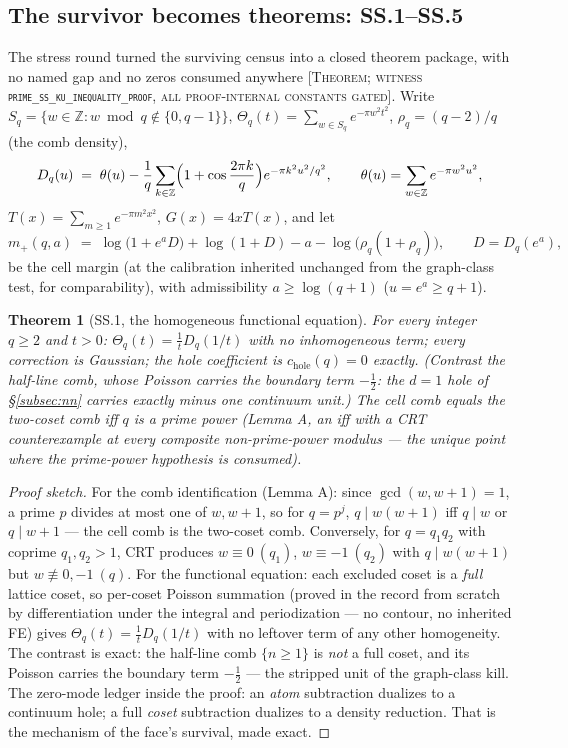 \documentclass[11pt,reqno]{amsart}
\theoremstyle{plain}
\newtheorem{theorem}{Theorem}[section]
\theoremstyle{definition}
\theoremstyle{remark}
\newcommand{\Z}{\mathbb{Z}}
\newcommand{\grade}[1]{\textup{[\textsc{#1}]}}
\begin{document}
\subsection{The survivor becomes theorems: SS.1--SS.5}\label{subsec:ss}

The stress round turned the surviving census into a closed theorem package, with no named
gap and no zeros consumed anywhere \grade{Theorem; witness
\texttt{prime\_\allowbreak ss\_\allowbreak ku\_\allowbreak inequality\_\allowbreak proof}, all proof-internal constants gated}. Write
$S_q = \{w \in \Z : w \bmod q \notin \{0, q-1\}\}$,
$\Theta_q(t) = \sum_{w \in S_q} e^{-\pi w^2 t^2}$, $\rho_q = (q-2)/q$ (the comb
density),
\[
D_q(u) \;=\; \theta(u) - \frac1q \sum_{k \in \Z}
\Bigl(1 + \cos\frac{2\pi k}{q}\Bigr) e^{-\pi k^2 u^2/q^2},
\qquad \theta(u) = \sum_{w \in \Z} e^{-\pi w^2 u^2},
\]
$T(x) = \sum_{m \ge 1} e^{-\pi m^2 x^2}$, $G(x) = 4xT(x)$, and let
\[
m_+(q, a) \;=\; \log\bigl(1 + e^a D\bigr) + \log(1 + D) - a -
\log\bigl(\rho_q (1 + \rho_q)\bigr), \qquad D = D_q(e^a),
\]
be the cell margin (at the calibration inherited unchanged from the graph-class test, for
comparability), with admissibility $a \ge \log(q+1)$ ($u = e^a \ge q+1$).

\begin{theorem}[SS.1, the homogeneous functional equation]\label{thm:ss1}
For every integer $q \ge 2$ and $t > 0$: $\Theta_q(t) = \tfrac{1}{t} D_q(1/t)$ with
\emph{no} inhomogeneous term; every correction is Gaussian; the hole coefficient is
$c_{\mathrm{hole}}(q) = 0$ exactly. (Contrast the half-line comb, whose Poisson carries the
boundary term $-\tfrac12$: the $d = 1$ hole of \S\ref{subsec:nn} carries exactly minus one
continuum unit.) The cell comb equals the two-coset comb iff $q$ is a prime power
(Lemma A, an iff with a CRT counterexample at every composite non-prime-power modulus ---
the unique point where the prime-power hypothesis is consumed).
\end{theorem}

\begin{proof}[Proof sketch]
For the comb identification (Lemma A): since $\gcd(w, w+1) = 1$, a prime $p$ divides at most
one of $w, w+1$, so for $q = p^j$, $q \mid w(w+1)$ iff $q \mid w$ or $q \mid w+1$ --- the
cell comb is the two-coset comb. Conversely, for $q = q_1 q_2$ with coprime
$q_1, q_2 > 1$, CRT produces $w \equiv 0 \ (q_1)$, $w \equiv -1\ (q_2)$ with
$q \mid w(w+1)$ but $w \not\equiv 0, -1 \ (q)$. For the functional equation: each excluded
coset is a \emph{full} lattice coset, so per-coset Poisson summation (proved in the record
from scratch by differentiation under the integral and periodization --- no contour, no
inherited FE) gives $\Theta_q(t) = \tfrac1t D_q(1/t)$ with no leftover term of any other
homogeneity. The contrast is exact: the half-line comb $\{n \ge 1\}$ is \emph{not} a full
coset, and its Poisson carries the boundary term $-\tfrac12$ --- the stripped unit of the
graph-class kill. The zero-mode ledger inside the proof: an \emph{atom} subtraction dualizes
to a continuum hole; a full \emph{coset} subtraction dualizes to a density reduction. That
is the mechanism of the face's survival, made exact.
\end{proof}
\end{document}
